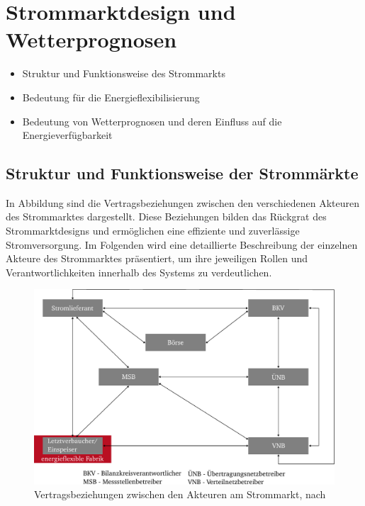 \section{Strommarktdesign und Wetterprognosen}
\label{ch_03Strommarktdesign und Wetterprognosen}
\begin{itemize}
	\item Struktur und Funktionsweise des Strommarkts
	\item Bedeutung für die Energieflexibilisierung 
	\item Bedeutung von Wetterprognosen und deren Einfluss auf die Energieverfügbarkeit
\end{itemize}

\subsection{Struktur und Funktionsweise der Strommärkte}
In Abbildung  sind die Vertragsbeziehungen zwischen den verschiedenen Akteuren des Strommarktes dargestellt. Diese Beziehungen bilden das Rückgrat des Strommarktdesigns und ermöglichen eine effiziente und zuverlässige Stromversorgung. Im Folgenden wird eine detaillierte Beschreibung der einzelnen Akteure des Strommarktes präsentiert, um ihre jeweiligen Rollen und Verantwortlichkeiten innerhalb des Systems zu verdeutlichen.\\
\begin{figure}[h]
	\centering
	\includegraphics[width=400pt]{figures/03_Grundlagen/Vertragsbeziehungen zwischen den Akteuren am Strommarkt.pdf}
	\caption{Vertragsbeziehungen zwischen den Akteuren am Strommarkt, nach \cite{VDI5207Blatt2020}}
	\label{fig_03Vertragsbeziehungen zwischen den Akteuren am Strommarkt}
\end{figure}

